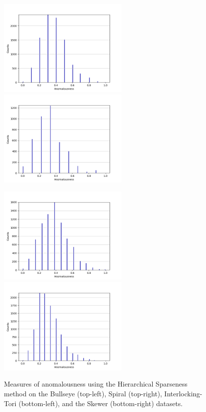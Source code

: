 \begin{figure}[!t]
\centering
\includegraphics[width=2.5in]{static/bullseye_hierarchical.png}\includegraphics[width=2.5in]{static/spiral_hierarchical.png}

\includegraphics[width=2.5in]{static/interlocking_tori_hierarchical.png}\includegraphics[width=2.5in]{static/skewer_hierarchical.png}

\caption{
Measures of anomalousness using the Hierarchical Sparseness method on the Bullseye (top-left), Spiral (top-right), Interlocking-Tori (bottom-left), and the Skewer (bottom-right) datasets.
}

\label{results:histograms:hierarchical}
\end{figure}


